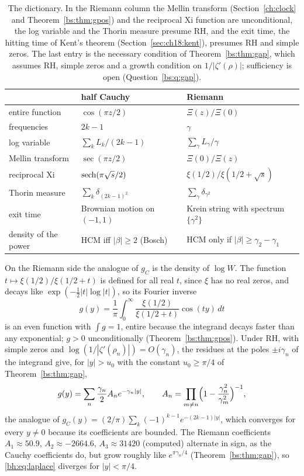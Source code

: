 \begin{table}[h]
\centering\small
\begin{tabular}{@{}lll@{}}
\toprule
 & half Cauchy & Riemann\\
\midrule
entire function & $\cos(\pi z/2)$ & $\Xi(z)/\Xi(0)$\\
frequencies & $2k-1$ & $\gamma$\\
log variable & $\sum_k L_k/(2k-1)$ & $\sum_\gamma L_\gamma/\gamma$\\
Mellin transform & $\sec(\pi z/2)$ & $\Xi(0)/\Xi(z)$\\
reciprocal Xi & $\operatorname{sech}(\pi\sqrt{s}/2)$ & $\xi(1/2)/\xi(1/2+\sqrt{s})$\\
Thorin measure & $\sum_k\delta_{(2k-1)^2}$ & $\sum_\gamma\delta_{\gamma^2}$\\
exit time & Brownian motion on $(-1,1)$ & Krein string with spectrum $\{\gamma^2\}$\\
density of the power & HCM iff $|\beta|\ge2$ (Bosch) & HCM only if $|\beta|\ge\gamma_2-\gamma_1$\\
\bottomrule
\end{tabular}
\caption{The dictionary. In the Riemann column the Mellin transform (Section~\ref{ch:clock} and Theorem~\ref{bs:thm:gpos}) and the reciprocal Xi function are unconditional, the log variable and the Thorin measure presume RH, and the exit time, the hitting time of Kent's theorem (Section~\ref{sec:ch18:kent}), presumes RH and simple zeros. The last entry is the necessary condition of Theorem~\ref{bs:thm:gap}, which assumes RH, simple zeros and a growth condition on $1/|\zeta'(\rho)|$; sufficiency is open (Question~\ref{bs:q:gap}).}
\label{bh:tab:dict}
\end{table}

On the Riemann side the analogue of $g_C$ is the density of $\log W$. The function $t\mapsto\xi(1/2)/\xi(1/2+t)$ is defined for all real $t$, since $\xi$ has no real zeros, and decays like $\exp(-\tfrac12|t|\log|t|)$, so its Fourier inverse
\[
g(y)=\frac1\pi\int_0^\infty\frac{\xi(1/2)}{\xi(1/2+t)}\cos(ty)\,dt
\]
is an even function with $\int g=1$, entire because the integrand decays faster than any exponential; $g>0$ unconditionally (Theorem~\ref{bs:thm:gpos}). Under RH, with simple zeros and $\log(1/|\zeta'(\rho_n)|)=O(\gamma_n)$, the residues at the poles $\pm i\gamma_n$ of the integrand give, for $|y|>u_0$ with the constant $u_0\ge\pi/4$ of Theorem~\ref{bs:thm:gap},
\begin{equation}\label{bh:eq:laplace}
g(y)=\sum_n\frac{\gamma_n}{2}A_ne^{-\gamma_n|y|},\qquad A_n=\prod_{m\ne n}\Bigl(1-\frac{\gamma_n^2}{\gamma_m^2}\Bigr)^{-1},
\end{equation}
the analogue of $g_C(y)=(2/\pi)\sum_k(-1)^{k-1}e^{-(2k-1)|y|}$, which converges for every $y\ne0$ because its coefficients are bounded. The Riemann coefficients $A_1\approx50.9$, $A_2\approx-2664.6$, $A_3\approx31420$ (computed) alternate in sign, as the Cauchy coefficients do, but grow roughly like $e^{\pi\gamma_n/4}$ (Theorem~\ref{bs:thm:gap}), so \eqref{bh:eq:laplace} diverges for $|y|<\pi/4$.

